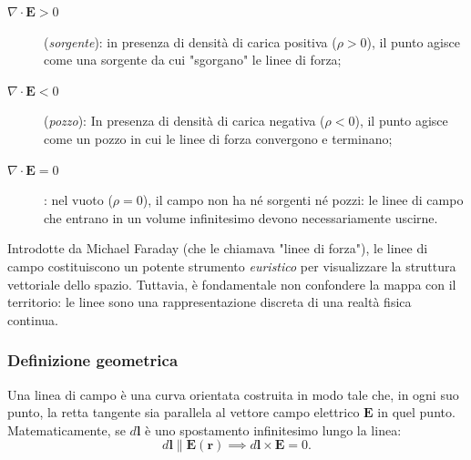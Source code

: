 \documentclass[a4paper,11pt]{report}
\begin{document}
\begin{description}
    \item[$\nabla \cdot \bm{E} > 0$] (\emph{sorgente}): in presenza di densità di carica positiva ($\rho > 0$), il punto agisce come una sorgente da cui "sgorgano" le linee di forza;
    \item[$\nabla \cdot \bm{E} < 0$] (\emph{pozzo}): In presenza di densità di carica negativa ($\rho < 0$), il punto agisce come un pozzo in cui le linee di forza convergono e terminano;
    \item[$\nabla \cdot \bm{E} = 0$]: nel vuoto ($\rho = 0$), il campo non ha né sorgenti né pozzi: le linee di campo che entrano in un volume infinitesimo devono necessariamente uscirne.
\end{description}

\begin{approfondimento}[title={Le Linee di Campo: Realtà Fisica o Artificio Matematico?}]
\noindent
    Introdotte da Michael Faraday (che le chiamava "linee di forza"), le linee di campo costituiscono un potente strumento \textit{euristico} per visualizzare la struttura vettoriale dello spazio. Tuttavia, è fondamentale non confondere la mappa con il territorio: le linee sono una rappresentazione discreta di una realtà fisica continua.

    \subsubsection{Definizione geometrica}
    Una linea di campo è una curva orientata costruita in modo tale che, in ogni suo punto, la retta tangente sia parallela al vettore campo elettrico $\bm{E}$ in quel punto. Matematicamente, se $d\bm{l}$ è uno spostamento infinitesimo lungo la linea:
    \begin{equation}
        d\bm{l} \parallel \bm{E}(\bm{r}) \implies d\bm{l} \times \bm{E} = 0.
    \end{equation}
    
    \begin{center}
\end{center}
\end{approfondimento}
\end{document}
